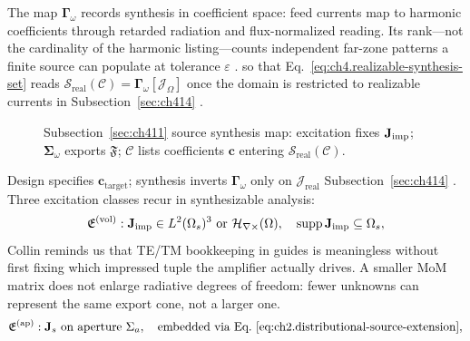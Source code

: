 The map $\boldsymbol{\Gamma}_\omega$ records synthesis in coefficient space: feed currents map to harmonic coefficients through retarded radiation and flux-normalized reading. Its rank---not the cardinality of the harmonic listing---counts independent far-zone patterns a finite source can populate at tolerance $\varepsilon$ \cite{stratton1941}.
so that Eq.~\eqref{eq:ch4.realizable-synthesis-set} reads
\(\mathcal{S}_{\mathrm{real}}(\mathcal{C})=\boldsymbol{\Gamma}_\omega[\mathcal{J}_\Omega]\) once the
domain is restricted to realizable currents in Subsection~\ref{sec:ch414} \cite{devaney2004}.
\begin{figure}[t]
\centering
{}
\caption{Subsection~\ref{sec:ch411} source synthesis map: excitation fixes \(\mathbf{J}_{\mathrm{imp}}\); \(\boldsymbol{\Sigma}_\omega\)
exports \(\mathfrak{F}\); \(\mathcal{C}\) lists coefficients \(\mathbf{c}\) entering
\(\mathcal{S}_{\mathrm{real}}(\mathcal{C})\).}
\label{fig:ch4.excitation-synthesis-chain}
\end{figure}
Design specifies \(\mathbf{c}_{\mathrm{target}}\); synthesis inverts
\(\boldsymbol{\Gamma}_\omega\) only on \(\mathcal{J}_{\mathrm{real}}\)
Subsection~\ref{sec:ch414} \cite{devaney2004}.
Three excitation classes recur in synthesizable analysis:
\begin{equation}
\label{eq:ch4.excitation-class-volume}
\mathfrak{E}^{(\mathrm{vol})}:
\mathbf{J}_{\mathrm{imp}}\in L^{2}(\Omega_{s})^{3}\ \text{or}\ \mathcal{H}_{\nabla\times}(\Omega),
\quad
\operatorname{supp}\mathbf{J}_{\mathrm{imp}}\subseteq\Omega_{s},
\end{equation}
Collin reminds us that TE/TM bookkeeping in guides is meaningless without first fixing which impressed tuple the amplifier actually drives. \cite{hansen1988}
A smaller MoM matrix does not enlarge radiative degrees of freedom: fewer unknowns can represent the same export cone, not a larger one. \cite{stratton1941}
\begin{equation}
\label{eq:ch4.excitation-class-aperture}
\mathfrak{E}^{(\mathrm{ap})}:
\mathbf{J}_{s}\ \text{on aperture}\ \Sigma_{a},
\quad
\text{embedded via Eq.~\eqref{eq:ch2.distributional-source-extension}},
\end{equation}
